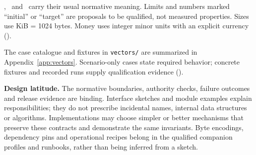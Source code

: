 \must, \mustnot\ and \should\ carry their usual normative meaning. Limits and numbers marked ``initial'' or ``target'' are proposals to be qualified, not measured properties. Sizes use KiB = 1024 bytes. Money uses integer minor units with an explicit currency ().

The case catalogue and fixtures in \texttt{vectors/} are summarized in Appendix~\ref{app:vectors}. Scenario-only cases state required behavior; concrete fixtures and recorded runs supply qualification evidence ().

\textbf{Design latitude.} The normative boundaries, authority checks, failure outcomes and release evidence are binding. Interface sketches and module examples explain responsibilities; they do not prescribe incidental names, internal data structures or algorithms. Implementations may choose simpler or better mechanisms that preserve these contracts and demonstrate the same invariants. Byte encodings, dependency pins and operational recipes belong in the qualified companion profiles and runbooks, rather than being inferred from a sketch.
